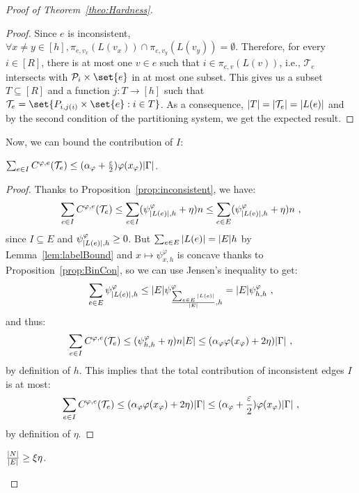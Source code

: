 \begin{proof}[Proof of Theorem~\ref{theo:Hardness}]
\begin{proof}
  Since $e$ is inconsistent, $\forall x \not= y \in [h], \pi_{e,v_x}(L(v_x)) \cap \pi_{e,v_y}(L(v_y)) = \emptyset$. Therefore, for every $i \in [R]$, there is at most one $v \in e$ such that $i \in \pi_{e,v}(L(v))$, i.e., $\mathcal{T}_e$ intersects with $\mathcal{P}_i \times \set{e}$ in at most one subset. This gives us a subset $T \subseteq [R]$ and a function $j : T \rightarrow [h]$ such that $\mathcal{T}_e = \set{P_{i,j(i)} \times \set{e} : i \in T}$. As a consequence, $\abs{T} = \abs{\mathcal{T}_e} = \abs{L(e)}$ and by the second condition of the partitioning system, we get the expected result.
\end{proof}

Now, we can bound the contribution of $I$:

\begin{lemma}
  $\sum_{e \in I} C^{\varphi,e}(\mathcal{T}_e) \leq (\alpha_{\varphi} + \frac{\varepsilon}{2})\varphi(x_{\varphi})\abs{\Gamma}$.
  \label{lem:contribI}
\end{lemma}

\begin{proof}
Thanks to Proposition~\ref{prop:inconsistent}, we have:
  \[ \sum_{e \in I} C^{\varphi,e}(\mathcal{T}_e) \leq \sum_{e \in I} (\psi^{\varphi}_{\abs{L(e)},h} +\eta)n \leq \sum_{e \in E} (\psi^{\varphi}_{\abs{L(e)},h} +\eta)n \ ,\]
  since $I \subseteq E$ and $\psi^{\varphi}_{\abs{L(e)},h} \geq 0$. But $\sum_{e \in E} \abs{L(e)} = \abs{E}h$ by Lemma~\ref{lem:labelBound} and $x \mapsto \psi^{\varphi}_{x,h}$ is concave thanks to Proposition~\ref{prop:BinCon}, so we can use Jensen's inequality to get:
  \[ \sum_{e \in E} \psi^{\varphi}_{\abs{L(e)},h} \leq \abs{E} \psi^{\varphi}_{\frac{\sum_{e \in E} \abs{L(e)}}{\abs{E}},h} = \abs{E}\psi^{\varphi}_{h,h} \ ,\]
  and thus:
  \[  \sum_{e \in I} C^{\varphi,e}(\mathcal{T}_e) \leq (\psi^{\varphi}_{h,h} +\eta)n\abs{E} \leq (\alpha_{\varphi}\varphi(x_{\varphi}) + 2\eta)\abs{\Gamma} \ ,\]
  by definition of $h$. This implies that the total contribution of inconsistent edges $I$ is at most:
  \[ \sum_{e \in I} C^{\varphi,e}(\mathcal{T}_e) \leq (\alpha_{\varphi}\varphi(x_{\varphi}) + 2\eta)\abs{\Gamma} \leq (\alpha_{\varphi}+ \frac{\varepsilon}{2})\varphi(x_{\varphi})\abs{\Gamma} \ ,\]
  by definition of $\eta$.
\end{proof}

\begin{lemma}
  $\frac{\abs{N}}{\abs{E}} \geq \xi\eta$.
  \label{lem:nice}
\end{lemma}


\end{proof}

